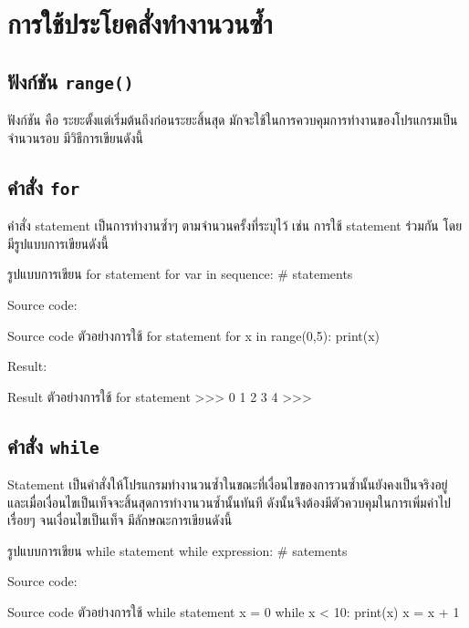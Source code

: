 \chapter{การใช้ประโยคสั่งทำงานวนซ้ำ}
\section{ฟังก์ชัน \texttt{range()}}

ฟังก์ชัน   คือ ระยะตั้งแต่เริ่มต้นถึงก่อนระยะสิ้นสุด มักจะใช้ในการควบคุมการทำงานของโปรแกรมเป็นจำนวนรอบ มีวิธีการเขียนดังนี้  

\section{คำสั่ง \texttt{for}}

คำสั่ง   statement เป็นการทำงานซ้ำๆ ตามจำนวนครั้งที่ระบุไว้ เช่น การใช้   statement ร่วมกัน   โดยมีรูปแบบการเขียนดังนี้

\begin{codelist}{รูปแบบการเขียน for statement}{}
for var in sequence:
    # statements
\end{codelist}

Source code:
\begin{codelist}{Source code ตัวอย่างการใช้ for statement}{}
for x in range(0,5): print(x)
\end{codelist}

Result:
\begin{codelist}{Result ตัวอย่างการใช้ for statement}{}
>>>
0
1
2
3
4
>>>
\end{codelist}

\section{คำสั่ง \texttt{while}}

  Statement เป็นคำสั่งให้โปรแกรมทำงานวนซ้ำในขณะที่เงื่อนไขของการวนซ้ำนั้นยังคงเป็นจริงอยู่ และเมื่อเงื่อนไขเป็นเท็จจะสิ้นสุดการทำงานวนซ้ำนั้นทันที ดังนั้นจึงต้องมีตัวควบคุมในการเพิ่มค่าไปเรื่อยๆ จนเงื่อนไขเป็นเท็จ มีลักษณะการเขียนดังนี้

\begin{codelist}{รูปแบบการเขียน while statement}{}
while expression:
    # satements
\end{codelist}

Source code:
\begin{codelist}{Source code ตัวอย่างการใช้ while statement}{}
x = 0
while x < 10:
    print(x)
    x = x + 1
\end{codelist}

